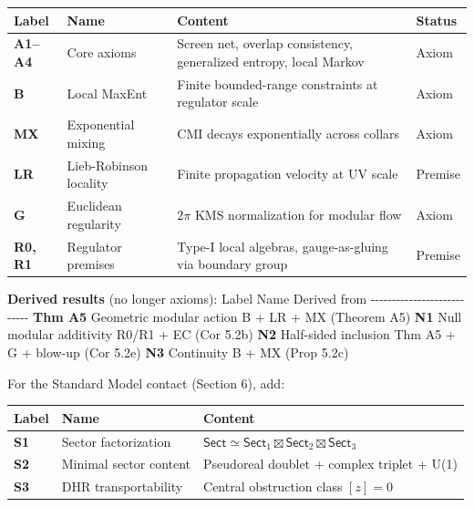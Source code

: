 {\def\LTcaptype{none} %
\begin{longtable}[]{@{}llll@{}}
\toprule\noalign{}
Label & Name & Content & Status \\
\midrule\noalign{}
\endhead
\bottomrule\noalign{}
\endlastfoot
\textbf{A1--A4} & Core axioms & Screen net, overlap consistency, generalized entropy, local Markov & Axiom \\
\textbf{B} & Local MaxEnt & Finite bounded-range constraints at regulator scale & Axiom \\
\textbf{MX} & Exponential mixing & CMI decays exponentially across collars & Axiom \\
\textbf{LR} & Lieb-Robinson locality & Finite propagation velocity at UV scale & Premise \\
\textbf{G} & Euclidean regularity & \(2\pi\) KMS normalization for modular flow & Axiom \\
\textbf{R0, R1} & Regulator premises & Type-I local algebras, gauge-as-gluing via boundary group & Premise \\
\end{longtable}
}

\textbf{Derived results} (no longer axioms): \textbar{} Label \textbar{} Name \textbar{} Derived from \textbar{} \textbar-\/-\/-\/-\/-\/-\/-\textbar-\/-\/-\/-\/-\/-\textbar-\/-\/-\/-\/-\/-\/-\/-\/-\/-\/-\/-\/-\/-\textbar{} \textbar{} \textbf{Thm A5} \textbar{} Geometric modular action \textbar{} B + LR + MX (Theorem A5) \textbar{} \textbar{} \textbf{N1} \textbar{} Null modular additivity \textbar{} R0/R1 + EC (Cor 5.2b) \textbar{} \textbar{} \textbf{N2} \textbar{} Half-sided inclusion \textbar{} Thm A5 + G + blow-up (Cor 5.2e) \textbar{} \textbar{} \textbf{N3} \textbar{} Continuity \textbar{} B + MX (Prop 5.2c) \textbar{}

For the Standard Model contact (Section 6), add:

{\def\LTcaptype{none} %
\begin{longtable}[]{@{}lll@{}}
\toprule\noalign{}
Label & Name & Content \\
\midrule\noalign{}
\endhead
\bottomrule\noalign{}
\endlastfoot
\textbf{S1} & Sector factorization & \(\mathsf{Sect} \simeq \mathsf{Sect}_1 \boxtimes \mathsf{Sect}_2 \boxtimes \mathsf{Sect}_3\) \\
\textbf{S2} & Minimal sector content & Pseudoreal doublet + complex triplet + U(1) \\
\textbf{S3} & DHR transportability & Central obstruction class \([z] = 0\) \\
\end{longtable}
}

